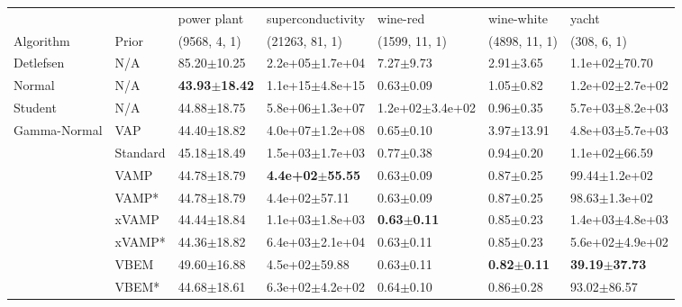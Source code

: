 \begin{tabular}{lllllll}
\midrule
             &       &               power plant &           superconductivity &                wine-red &              wine-white &                     yacht \\
Algorithm & Prior& (9568, 4, 1)& (21263, 81, 1)& (1599, 11, 1)& (4898, 11, 1)& (308, 6, 1)\\
\midrule
Detlefsen & N/A &           85.20$\pm$10.25 &         2.2e+05$\pm$1.7e+04 &           7.27$\pm$9.73 &           2.91$\pm$3.65 &         1.1e+02$\pm$70.70 \\
Normal & N/A &  \textbf{43.93$\pm$18.42} &         1.1e+15$\pm$4.8e+15 &           0.63$\pm$0.09 &           1.05$\pm$0.82 &       1.2e+02$\pm$2.7e+02 \\
Student & N/A &           44.88$\pm$18.75 &         5.8e+06$\pm$1.3e+07 &     1.2e+02$\pm$3.4e+02 &           0.96$\pm$0.35 &       5.7e+03$\pm$8.2e+03 \\
Gamma-Normal & VAP &           44.40$\pm$18.82 &         4.0e+07$\pm$1.2e+08 &           0.65$\pm$0.10 &          3.97$\pm$13.91 &       4.8e+03$\pm$5.7e+03 \\
             & Standard &           45.18$\pm$18.49 &         1.5e+03$\pm$1.7e+03 &           0.77$\pm$0.38 &           0.94$\pm$0.20 &         1.1e+02$\pm$66.59 \\
             & VAMP &           44.78$\pm$18.79 &  \textbf{4.4e+02$\pm$55.55} &           0.63$\pm$0.09 &           0.87$\pm$0.25 &         99.44$\pm$1.2e+02 \\
             & VAMP* &           44.78$\pm$18.79 &           4.4e+02$\pm$57.11 &           0.63$\pm$0.09 &           0.87$\pm$0.25 &         98.63$\pm$1.3e+02 \\
             & xVAMP &           44.44$\pm$18.84 &         1.1e+03$\pm$1.8e+03 &  \textbf{0.63$\pm$0.11} &           0.85$\pm$0.23 &       1.4e+03$\pm$4.8e+03 \\
             & xVAMP* &           44.36$\pm$18.82 &         6.4e+03$\pm$2.1e+04 &           0.63$\pm$0.11 &           0.85$\pm$0.23 &       5.6e+02$\pm$4.9e+02 \\
             & VBEM &           49.60$\pm$16.88 &           4.5e+02$\pm$59.88 &           0.63$\pm$0.11 &  \textbf{0.82$\pm$0.11} &  \textbf{39.19$\pm$37.73} \\
             & VBEM* &           44.68$\pm$18.61 &         6.3e+02$\pm$4.2e+02 &           0.64$\pm$0.10 &           0.86$\pm$0.28 &           93.02$\pm$86.57 \\
\bottomrule
\end{tabular}


